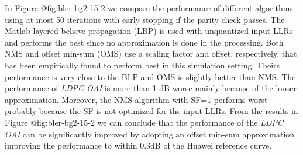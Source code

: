\documentclass{article}
\begin{document}
In Figure {@fig:bler-bg2-15-2} we compare the performance of different algorithms using at most 50 iterations with early stopping if the parity check passes. The Matlab layered believe propagation (LBP) is used with unquantized input LLRs and performs the best since no approximation is done in the processing. Both NMS and offset min-sum (OMS) use a scaling factor and offset, respectively, that has been empirically found to perform best in this simulation setting. Theirs performance is very close to the BLP and OMS is slightly better than NMS. The performance of \textit{LDPC OAI} is more than 1 dB worse mainly because of the looser approximation. Moreover, the NMS algorithm with SF=1 performs worst probably because the SF is not optimized for the input LLRs. From the results in Figure {@fig:bler-bg2-15-2} we can conclude that the performance of the \textit{LDPC OAI} can be significantly improved by adopting an offset min-sum approximation improving the performance to within 0.3dB of the Huawei reference curve.
\end{document}
